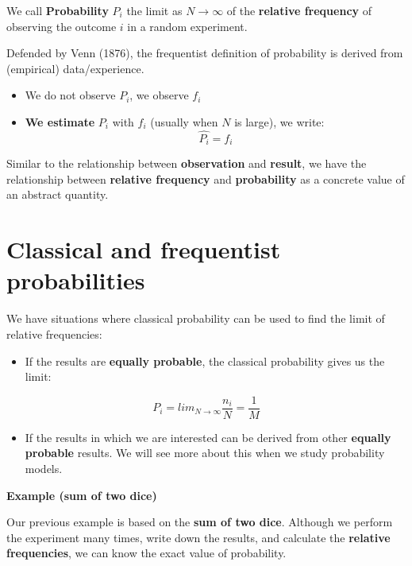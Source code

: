 \documentclass[
]{book}
\providecommand{\tightlist}{%
  \setlength{\itemsep}{0pt}\setlength{\parskip}{0pt}}
\begin{document}
We call \textbf{Probability} \(P_i\) the limit as \(N \rightarrow \infty\) of the \textbf{relative frequency} of observing the outcome \(i\) in a random experiment.

Defended by Venn (1876), the frequentist definition of probability is derived from (empirical) data/experience.

\begin{itemize}
\tightlist
\item
  We do not observe \(P_i\), we observe \(f_i\)
\item
  \textbf{We estimate} \(P_i\) with \(f_i\) (usually when \(N\) is large), we write: \[\hat {P_ i}= f_i\]
\end{itemize}

Similar to the relationship between \textbf{observation} and \textbf{result}, we have the relationship between \textbf{relative frequency} and \textbf{probability} as a concrete value of an abstract quantity.

\hypertarget{classical-and-frequentist-probabilities}{%
\section{Classical and frequentist probabilities}\label{classical-and-frequentist-probabilities}}

We have situations where classical probability can be used to find the limit of relative frequencies:

\begin{itemize}
\tightlist
\item
  If the results are \textbf{equally probable}, the classical probability gives us the limit:
\end{itemize}

\[P_i=lim_{N\rightarrow \infty} \frac{n_i}{N}=\frac{1}{M}\]

\begin{itemize}
\tightlist
\item
  If the results in which we are interested can be derived from other \textbf{equally probable} results. We will see more about this when we study probability models.
\end{itemize}

\textbf{Example (sum of two dice)}

Our previous example is based on the \textbf{sum of two dice}.
Although we perform the experiment many times, write down the results, and calculate the \textbf{relative frequencies}, we can know the exact value of probability.
\end{document}
